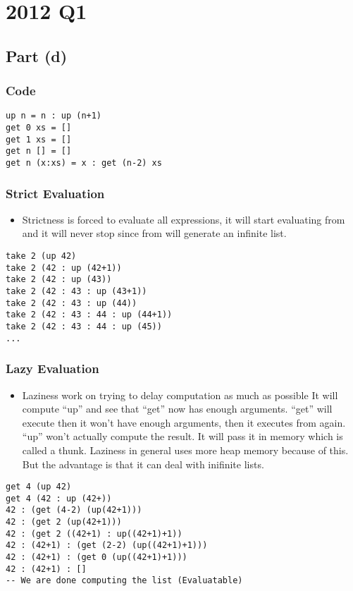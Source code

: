 \documentclass[11pt]{article}
\begin{document}
\section{2012 Q1}
\label{sec:org300138e}
\subsection{Part (d)}
\label{sec:orgfb4dcf4}
\subsubsection{Code}
\label{sec:orgea14558}
\begin{verbatim}
up n = n : up (n+1)
get 0 xs = []
get 1 xs = []
get n [] = []
get n (x:xs) = x : get (n-2) xs
\end{verbatim}
\subsubsection{Strict Evaluation}
\label{sec:orgbe182b5}
\begin{itemize}
\item Strictness is forced to evaluate all expressions, it will start
evaluating from and it will never stop since from will generate
an infinite list.
\end{itemize}
\begin{verbatim}
take 2 (up 42)
take 2 (42 : up (42+1))
take 2 (42 : up (43))
take 2 (42 : 43 : up (43+1))
take 2 (42 : 43 : up (44))
take 2 (42 : 43 : 44 : up (44+1))
take 2 (42 : 43 : 44 : up (45))
...
\end{verbatim}
\subsubsection{Lazy Evaluation}
\label{sec:orgb49111f}
\begin{itemize}
\item Laziness work on trying to delay computation as much as possible
It will compute ``up'' and see that ``get'' now has enough arguments.
``get'' will execute then it won't have enough arguments, then it executes from
again. ``up'' won't actually compute the result. It will pass it in memory
which is called a thunk. Laziness in general uses more heap memory because of this.
But the advantage is that it can deal with inifinite lists.
\end{itemize}
\begin{verbatim}
get 4 (up 42)
get 4 (42 : up (42+))
42 : (get (4-2) (up(42+1)))
42 : (get 2 (up(42+1)))
42 : (get 2 ((42+1) : up((42+1)+1))
42 : (42+1) : (get (2-2) (up((42+1)+1)))
42 : (42+1) : (get 0 (up((42+1)+1)))
42 : (42+1) : []
-- We are done computing the list (Evaluatable)
\end{verbatim}
\end{document}
